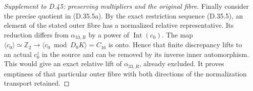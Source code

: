 \begin{proof}[Supplement to D.45: preserving multipliers and the original fibre]
Finally consider the precise quotient in
(D.35.5a). By the exact restriction sequence
(D.35.5), an element of the stated outer fibre
has a normalized relative representative.
Its reduction differs from
\(\alpha_{33,R}\) by a power of
\(\operatorname{Int}(c_0)\).
The map
\(\langle c_0\rangle\simeq\mathbb Z_2
\to\langle c_0\bmod D_9K\rangle=C_{16}\)
is onto. Hence that finite discrepancy lifts
to an actual \(c_0^z\) in the source and can
be removed by its inverse inner automorphism.
This would give an exact relative lift of
\(\alpha_{33,R}\), already excluded.
It proves emptiness of that particular outer
fibre with both directions of the
normalization transport retained.
\end{proof}

